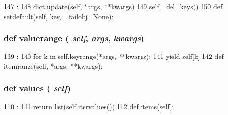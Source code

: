 \begin{DoxyCode}
147                                      :
148         dict.update(self, *args, **kwargs)
149         self._del_keys()
150 
    def setdefault(self, key, _failobj=None):
\end{DoxyCode}
\hypertarget{classm5_1_1util_1_1sorteddict_1_1SortedDict_a25c1d568ae966d7cb5662748006c02a7}{
\subsubsection[{valuerange}]{\setlength{\rightskip}{0pt plus 5cm}def valuerange ( {\em self}, \/   {\em args}, \/   {\em kwargs})}}
\label{classm5_1_1util_1_1sorteddict_1_1SortedDict_a25c1d568ae966d7cb5662748006c02a7}



\begin{DoxyCode}
139                                          :
140         for k in self.keyrange(*args, **kwargs):
141             yield self[k]
142 
    def itemrange(self, *args, **kwargs):
\end{DoxyCode}
\hypertarget{classm5_1_1util_1_1sorteddict_1_1SortedDict_abb73a0060caeba53780d972f37623f1e}{
\subsubsection[{values}]{\setlength{\rightskip}{0pt plus 5cm}def values ( {\em self})}}
\label{classm5_1_1util_1_1sorteddict_1_1SortedDict_abb73a0060caeba53780d972f37623f1e}



\begin{DoxyCode}
110                     :
111         return list(self.itervalues())
112 
    def items(self):
\end{DoxyCode}



